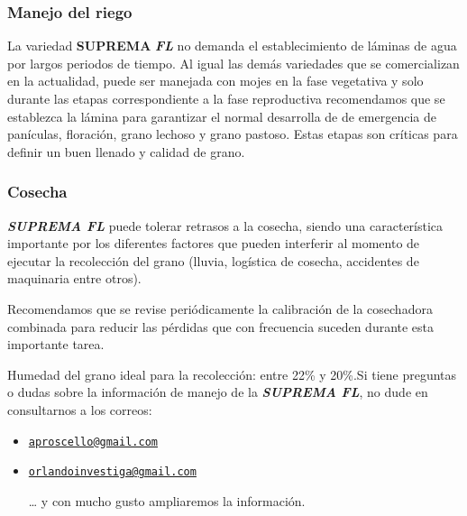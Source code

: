 \documentclass[
  letterpaper,
  DIV=11,
  numbers=noendperiod]{scrartcl}
\begin{document}
\subsubsection{\texorpdfstring{\textbf{Manejo del
riego}}{Manejo del riego}}\label{manejo-del-riego}

La variedad \textbf{SUPREMA} \textbf{\emph{FL}} no demanda el
establecimiento de láminas de agua por largos periodos de tiempo. Al
igual las demás variedades que se comercializan en la actualidad, puede
ser manejada con mojes en la fase vegetativa y solo durante las etapas
correspondiente a la fase reproductiva recomendamos que se establezca la
lámina para garantizar el normal desarrolla de de emergencia de
panículas, floración, grano lechoso y grano pastoso. Estas etapas son
críticas para definir un buen llenado y calidad de grano.

\subsubsection{\texorpdfstring{\textbf{Cosecha}}{Cosecha}}\label{cosecha}

\textbf{\emph{SUPREMA FL}} puede tolerar retrasos a la cosecha, siendo
una característica importante por los diferentes factores que pueden
interferir al momento de ejecutar la recolección del grano (lluvia,
logística de cosecha, accidentes de maquinaria entre otros).

Recomendamos que se revise periódicamente la calibración de la
cosechadora combinada para reducir las pérdidas que con frecuencia
suceden durante esta importante tarea.

Humedad del grano ideal para la recolección: entre 22\% y 20\%.Si tiene
preguntas o dudas sobre la información de manejo de la
\textbf{\emph{SUPREMA FL}}, no dude en consultarnos a los correos:

\begin{itemize}
\item
  \href{mailto:aproscello@gmail.com}{\nolinkurl{aproscello@gmail.com}}
\item
  \href{mailto:orlandoinvestiga@gmail.com}{\nolinkurl{orlandoinvestiga@gmail.com}}

  \ldots{} y con mucho gusto ampliaremos la información.
\end{itemize}
\end{document}
